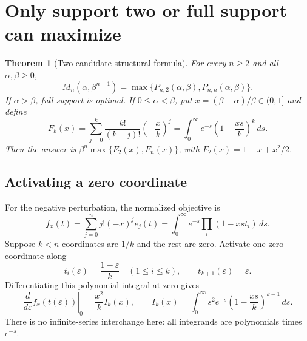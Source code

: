 \documentclass[11pt]{article}
\newtheorem{theorem}{Theorem}[section]
\theoremstyle{definition}\newtheorem{definition}[theorem]{Definition}
\theoremstyle{remark}\newtheorem{remark}[theorem]{Remark}
\begin{document}
\section{Only support two or full support can maximize}\label{sec:twoorn}
\begin{theorem}[Two-candidate structural formula]\label{thm:family}
For every $n\geq2$ and all $\alpha,\beta\geq0$,
\begin{equation}\label{eq:familymain}
 \boxed{M_n(\alpha,\beta^{n-1})=
       \max\{P_{n,2}(\alpha,\beta),P_{n,n}(\alpha,\beta)\}.}
\end{equation}
If $\alpha>\beta$, full support is optimal. If $0\leq\alpha<\beta$, put $x=(\beta-\alpha)/\beta\in(0,1]$ and define
\begin{equation}\label{eq:Fk}
 F_k(x)=\sum_{j=0}^k\frac{k!}{(k-j)!}\left(-\frac{x}{k}\right)^j
       =\int_0^\infty e^{-s}\left(1-\frac{xs}{k}\right)^k\,ds.
\end{equation}
Then the answer is $\beta^n\max\{F_2(x),F_n(x)\}$, with $F_2(x)=1-x+x^2/2$.
\end{theorem}

\subsection{Activating a zero coordinate}
For the negative perturbation, the normalized objective is
\[
 f_x(t)=\sum_{j=0}^n j!(-x)^j e_j(t)
       =\int_0^\infty e^{-s}\prod_i(1-xst_i)\,ds.
\]
Suppose $k<n$ coordinates are $1/k$ and the rest are zero. Activate one zero coordinate along
\[
 t_i(\varepsilon)=\frac{1-\varepsilon}{k}\quad(1\leq i\leq k),
 \qquad t_{k+1}(\varepsilon)=\varepsilon.
\]
Differentiating this polynomial integral at zero gives
\begin{equation}\label{eq:activation}
 \left.\frac{d}{d\varepsilon}f_x(t(\varepsilon))\right|_{0}
 =\frac{x^2}{k}I_k(x),\qquad
 I_k(x)=\int_0^\infty s^2e^{-s}
             \left(1-\frac{xs}{k}\right)^{k-1}\,ds.
\end{equation}
There is no infinite-series interchange here: all integrands are polynomials times $e^{-s}$.
\end{document}
